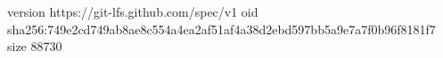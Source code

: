 version https://git-lfs.github.com/spec/v1
oid sha256:749e2cd749ab8ae8c554a4ea2af51af4a38d2ebd597bb5a9e7a7f0b96f8181f7
size 88730
